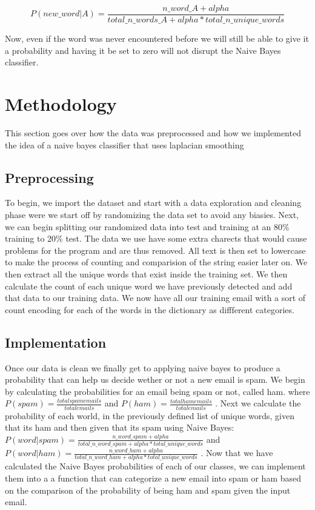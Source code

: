  \[P(new\_word|A)= \frac{n\_word\_A + alpha}{total\_n\_words\_A + alpha*total\_n\_unique\_words}\]
 
 
 Now, even if the word was never encountered before we will still be able to give it a probability and having it be set to zero will not disrupt the Naive Bayes classifier.

\section{Methodology}
This section goes over how the data was preprocessed and how we implemented the idea of a naive bayes classifier that uses laplacian smoothing
\subsection{Preprocessing}
To begin, we import the dataset and start with a data exploration and cleaning phase were we start off by randomizing the data set to avoid any biasies. Next, we can begin splitting our randomized data into test and training at an 80\% training to 20\% test. The data we use have some extra charects that would cause problems for the program and are thus removed. All text is then set to lowercase to make the process of counting and comparision of the string easier later on.
We then extract all the unique words that exist inside the training set. We then calculate the count of each unique word we have previously detected and add that data to our training data. We now have all our training email with a sort of count encoding for each of the words in the dictionary as diffferent categories. 

\subsection{Implementation}
Once our data is clean we finally get to applying naive bayes to produce a probability that can help us decide wether or not a new email is spam. We begin by calculating the probabilities for an email being spam or not, called ham. where \( P(spam) = \frac{total spam emails}{total emails} \) and \( P(ham) = \frac{total ham emails}{total emails} \) . Next we calculate the probability of each world, in the previously defined list of unique words, given that its ham and then given that its spam using Naive Bayes:  \( P(word|spam) = \frac{n\_word\_spam + alpha }{total\_n\_word\_spam+ alpha*total\_unique\_words} \) and 
\( P(word|ham) = \frac{n\_word\_ham + alpha }{total\_n\_word\_ham + alpha*total\_unique\_words} \) . Now that we have calculated the Naive Bayes probabilities of each of our classes, we can implement them into a a function that can categorize a new email into spam or ham based on the comparison of the probability of being ham and spam given the input email.


